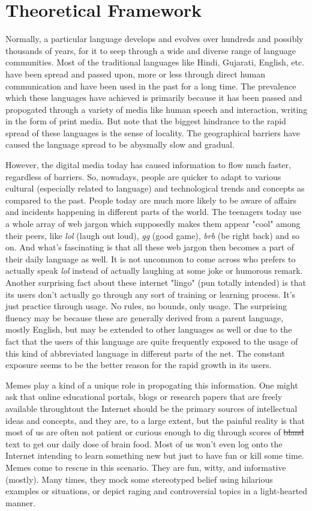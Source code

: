 \documentclass{article}
\begin{document}
\section{Theoretical Framework}
Normally, a particular language develops and evolves over hundreds and possibly thousands of years, for it to seep through a wide and diverse range of language communities. Most of the traditional languages like Hindi, Gujarati, English, etc. have been spread and passed upon, more or less through direct human communication and have been used in the past for a long time.  The prevalence which these languages have achieved is primarily because it has been passed and propogated through a variety of media like human speech and interaction, writing in the form of print media. But note that the biggest hindrance to the rapid spread of these languages is the sense of locality. The geographical barriers have caused the language spread to be abysmally slow and gradual.

However, the digital media today has caused information to flow much faster, regardless of barriers. So, nowadays, people are quicker to adapt to various cultural (especially related to language) and technological trends and concepts as compared to the past. People today are much more likely to be aware of affairs and incidents happening in different parts of the world. The teenagers today use a whole array of web jargon which supposedly makes them appear "cool" among their peers, like \textit{lol} (laugh out loud), \textit{gg} (good game), \textit{brb} (be right back) and so on. And what's fascinating is that all these web jargon then becomes a part of their daily language as well. It is not uncommon to come across who prefers to actually speak \textit{lol} instead of actually laughing at some joke or humorous remark. Another surprising fact about these internet "lingo" (pun totally intended) is that its users don't actually go through any sort of training or learning process. It's just practice through usage. No rules, no bounds, only usage. The surprising fluency may be because these are generally derived from a parent language, mostly English, but may be extended to other languages as well or due to the fact that the users of this language are quite frequently exposed to the usage of this kind of abbreviated language in different parts of the net. The constant exposure seems to be the better reason for the rapid growth in its users.

Memes play a kind of a unique role in propogating this information. One might ask that online educational portals, blogs or research papers that are freely available throughtout the Internet should be the primary sources of intellectual ideas and concepts, and they are, to a large extent, but the painful reality is that most of us are often not patient or curious enough to dig through scores of \st{bland} text to get our daily dose of brain food. Most of us won't even log onto the Internet intending to learn something new but just to have fun or kill some time. Memes come to rescue in this scenario. They are fun, witty, and informative (mostly). Many times, they mock some stereotyped belief using hilarious examples or situations, or depict raging and controversial topics in a light-hearted manner.
\end{document}
